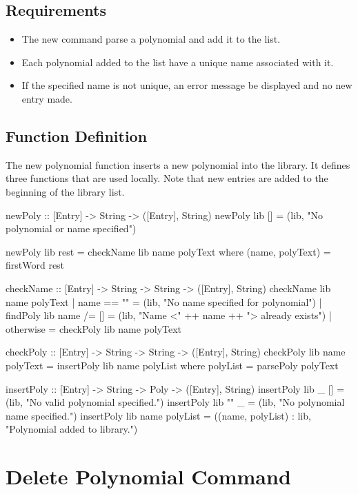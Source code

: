 \subsection{Requirements}
\begin{itemize}
\item The new command  parse a polynomial and add it to the list.
\item Each polynomial added to the list  have a unique name associated with it.
\item If the specified name is not unique, an error message  be displayed and no new entry made.
\end{itemize}
\subsection{Function Definition}
The new polynomial function inserts a new polynomial into the library.  It defines three functions that are used locally.  Note that new entries are added to the beginning of the library list.
\begin{code}
newPoly :: [Entry] -> String -> ([Entry], String)
newPoly lib [] = (lib, "No polynomial or name specified")

newPoly lib rest = checkName lib name polyText
  where
    (name, polyText) = firstWord rest

    checkName :: [Entry] -> String -> String -> ([Entry], String)
    checkName lib name polyText
      | name == ""              = (lib, "No name specified for polynomial")
      | findPoly lib name /= [] = (lib, "Name <" ++ name ++ "> already exists")
      | otherwise               = checkPoly lib name polyText

    checkPoly ::  [Entry] -> String -> String -> ([Entry], String)
    checkPoly lib name polyText = insertPoly lib name polyList
      where
        polyList = parsePoly polyText

    insertPoly :: [Entry] -> String -> Poly -> ([Entry], String)
    insertPoly lib _ [] = (lib, "No valid polynomial specified.")
    insertPoly lib "" _ = (lib, "No polynomial name specified.")
    insertPoly lib name polyList = ((name, polyList) : lib,
      "Polynomial added to library.")
\end{code}

\section{Delete Polynomial Command}
